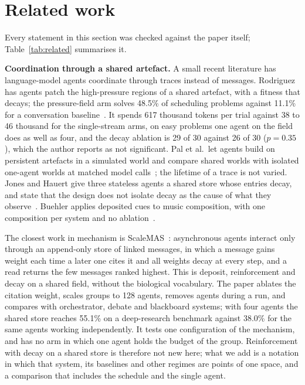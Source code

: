 \documentclass[10pt,twocolumn]{article}
\begin{document}
\section{Related work}\label{sec:related}

Every statement in this section was checked against the paper itself; Table~\ref{tab:related} summarises it.

\textbf{Coordination through a shared artefact.} A small recent literature has language-model agents coordinate through traces instead of messages. Rodriguez has agents patch the high-pressure regions of a shared artefact, with a fitness that decays; the pressure-field arm solves 48.5\% of scheduling problems against 11.1\% for a conversation baseline~\cite{rodriguez2026}. It spends 617 thousand tokens per trial against 38 to 46 thousand for the single-stream arms, on easy problems one agent on the field does as well as four, and the decay ablation is 29 of 30 against 26 of 30 ($p=0.35$), which the author reports as not significant. Pal et al.\ let agents build on persistent artefacts in a simulated world and compare shared worlds with isolated one-agent worlds at matched model calls~\cite{pal2026}; the lifetime of a trace is not varied. Jones and Hauert give three stateless agents a shared store whose entries decay, and state that the design does not isolate decay as the cause of what they observe~\cite{jones2026}. Buehler applies deposited cues to music composition, with one composition per system and no ablation~\cite{buehler2025}.

The closest work in mechanism is ScaleMAS~\cite{qi2026}: asynchronous agents interact only through an append-only store of linked messages, in which a message gains weight each time a later one cites it and all weights decay at every step, and a read returns the few messages ranked highest. This is deposit, reinforcement and decay on a shared field, without the biological vocabulary. The paper ablates the citation weight, scales groups to 128 agents, removes agents during a run, and compares with orchestrator, debate and blackboard systems; with four agents the shared store reaches 55.1\% on a deep-research benchmark against 38.0\% for the same agents working independently. It tests one configuration of the mechanism, and has no arm in which one agent holds the budget of the group. Reinforcement with decay on a shared store is therefore not new here; what we add is a notation in which that system, its baselines and other regimes are points of one space, and a comparison that includes the schedule and the single agent.
\end{document}
